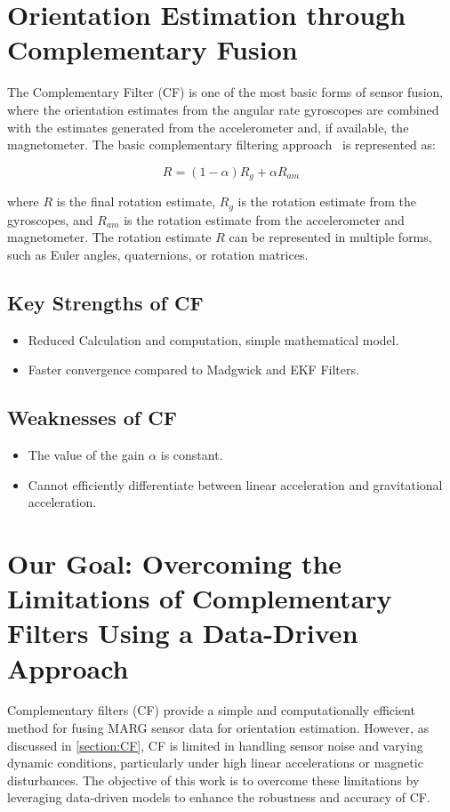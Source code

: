 \documentclass{iutbscthesis}
\begin{document}
\section{Orientation Estimation through Complementary Fusion}\label{section:CF}

The Complementary Filter (CF) is one of the most basic forms of sensor fusion, where the orientation estimates from the angular rate gyroscopes are combined with the estimates generated from the accelerometer and, if available, the magnetometer.  
The basic complementary filtering approach~\cite{forbes2015fundamentals, euston2008complementary} is represented as:  

\begin{equation}
    R = (1 - \alpha)R_g + \alpha R_{am}
\end{equation}

where $R$ is the final rotation estimate, $R_g$ is the rotation estimate from the gyroscopes, and $R_{am}$ is the rotation estimate from the accelerometer and magnetometer. The rotation estimate $R$ can be represented in multiple forms, such as Euler angles, quaternions, or rotation matrices.

\par
\subsection{Key Strengths of CF}
\begin{itemize}
    \item Reduced Calculation and computation, simple mathematical model.
    \item Faster convergence compared to Madgwick and EKF Filters\cite{valenti2015keeping}.
\end{itemize}
\subsection{Weaknesses of CF}
\begin{itemize}
    \item The value of the gain $\alpha$ is constant.
    \item Cannot efficiently differentiate between linear acceleration and gravitational acceleration.
\end{itemize}


\section{Our Goal: Overcoming the Limitations of Complementary Filters Using a Data-Driven Approach} \label{ourGoal}
Complementary filters (CF) provide a simple and computationally efficient method for fusing MARG sensor data for orientation estimation. However, as discussed in \autoref{section:CF}, CF is limited in handling sensor noise and varying dynamic conditions, particularly under high linear accelerations or magnetic disturbances. The objective of this work is to overcome these limitations by leveraging data-driven models to enhance the robustness and accuracy of CF.  
\end{document}
